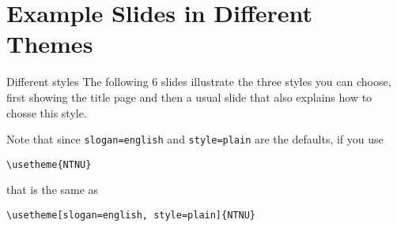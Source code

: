 \documentclass[aspectratio=169]{beamer}
\begin{document}
	\section{Example Slides in Different Themes}
	\begin{frame}[fragile]{Different styles}
		The following 6 slides illustrate the three styles you can choose,
		first showing the title page and then a usual slide that also explains how to chosse this style.

		Note that since \lstinline!slogan=english! and \lstinline!style=plain! are the defaults, if you use

		\lstinline!\usetheme{NTNU}!

		that is the same as

		\lstinline!\usetheme[slogan=english, style=plain]{NTNU}!
	\end{frame}
	{
		
		
		
	}
\end{document}
